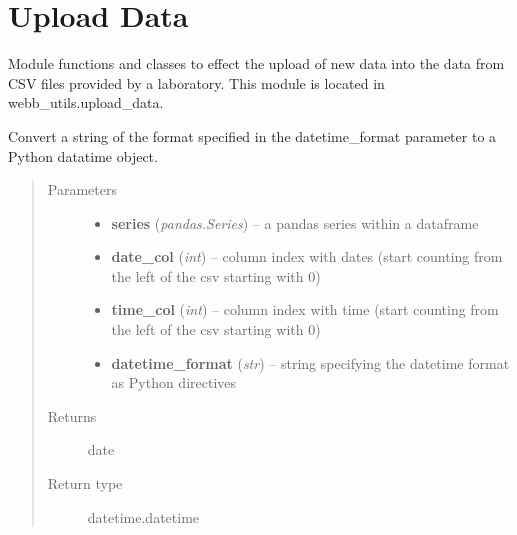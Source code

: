 \documentclass[letterpaper,10pt,english]{sphinxmanual}
\begin{document}
\section{Upload Data}
\label{modules:upload-data}
Module functions and classes to effect the upload
of new data into the data from CSV files provided
by a laboratory. This module is located in
webb\_utils.upload\_data.

\begin{fulllineitems}
\label{modules:webb_utils.upload_data.string_to_datetime}
Convert a string of the format specified in the datetime\_format
parameter to a Python datatime object.
\begin{quote}\begin{description}
\item[{Parameters}] \leavevmode\begin{itemize}
\item {} 
\textbf{series} (\emph{pandas.Series}) -- a pandas series within a dataframe

\item {} 
\textbf{date\_col} (\emph{int}) -- column index with dates (start counting from the left of the csv starting with 0)

\item {} 
\textbf{time\_col} (\emph{int}) -- column index with time (start counting from the left of the csv starting with 0)

\item {} 
\textbf{datetime\_format} (\emph{str}) -- string specifying the datetime format as Python directives

\end{itemize}

\item[{Returns}] \leavevmode
date

\item[{Return type}] \leavevmode
datetime.datetime

\end{description}\end{quote}

\end{fulllineitems}

\end{document}
